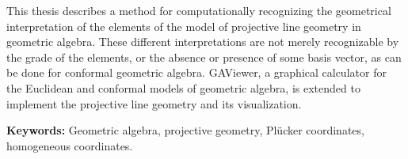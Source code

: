 This thesis describes a method for computationally recognizing the geometrical interpretation of the elements of the model of projective line geometry in geometric algebra.  These different interpretations are not merely recognizable by the grade of the elements, or the absence or presence of some basis vector, as can be done for conformal geometric algebra.  GAViewer, a graphical calculator for the Euclidean and conformal models of geometric algebra, is extended to implement the projective line geometry and its visualization.

\textbf{Keywords:} Geometric algebra, projective geometry, Pl\"ucker coordinates, homogeneous coordinates.

